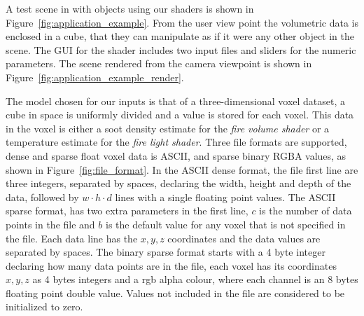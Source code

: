 A test scene in \Maya with objects using our shaders is shown in Figure~\ref{fig:application_example}.
From the user view point the volumetric data is enclosed in a cube, that they can manipulate as if it were any other object in the scene.
The GUI for the shader includes two input files and  sliders for the numeric parameters. 
The scene rendered from the camera viewpoint is shown in Figure~\ref{fig:application_example_render}.

The model chosen for our inputs is that of a three-dimensional voxel dataset, a cube in space is uniformly divided and a value is stored for each voxel.
This data in the voxel is either a soot density estimate for the \textit{fire volume shader} or a temperature estimate for the \textit{fire light shader}.
Three file formats are supported, dense and sparse float voxel data is ASCII, and sparse binary RGBA values, as shown in Figure~\ref{fig:file_format}.
In the ASCII dense format, the file first line are three integers, separated by spaces, declaring the width, height and depth of the data, followed by $w \cdot h \cdot d$ lines with a single floating point values.
The ASCII sparse format, has two extra parameters in the first line, $c$ is the number of data points in the file and $b$ is the default value for any voxel that is not specified in the file.
Each data line has the $x,y,z$ coordinates and the data values are separated by spaces.
The binary sparse format starts with a 4 byte integer declaring how many data points are in the file, each voxel has its coordinates $x,y,z$ as 4 bytes integers and a rgb alpha colour, where each channel is an 8 bytes floating point double value.
Values not included in the file are considered to be initialized to zero. 

